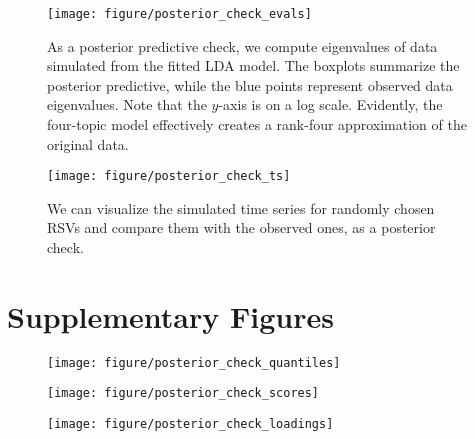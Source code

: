 \documentclass[oupdraft]{bio}
\begin{document}
\begin{figure}[!p]
  \centering
  \texttt{[image: figure/posterior\_check\_evals]}
  \caption{As a posterior predictive check, we compute eigenvalues of data
    simulated from the fitted LDA model. The boxplots summarize the posterior
    predictive, while the blue points represent observed data eigenvalues. Note
    that the $y$-axis is on a log scale. Evidently, the four-topic model
    effectively creates a rank-four approximation of the original
    data. \label{fig:antibiotics_posterior_evals}}
\end{figure}

\begin{figure}[!p]
  \centering
  \texttt{[image: figure/posterior\_check\_ts]}
  \caption{We can visualize the simulated time series for randomly chosen RSVs
    and compare them with the observed ones, as a posterior check.
    \label{fig:antibiotics_posterior_ts}}
\end{figure}


\section{Supplementary Figures}

\begin{figure}[!p]
  \centering
  \texttt{[image: figure/posterior\_check\_quantiles]}
  \caption{\label{fig:antibiotics_posterior_quantiles} }
\end{figure}


\begin{figure}[!p]
  \centering
  \texttt{[image: figure/posterior\_check\_scores]}
  \caption{\label{fig:antibiotics_posterior_scores} }
\end{figure}

\begin{figure}[!p]
  \centering
  \texttt{[image: figure/posterior\_check\_loadings]}
  \caption{\label{fig:antibiotics_poterior_loadings} }
\end{figure}
\end{document}
